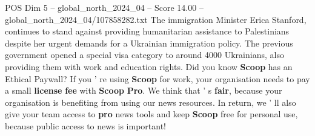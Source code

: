 \begin{textsample}{POS Dim 5 – global\_north\_2024\_04 – Score 14.00 – global\_north\_2024\_04/107858282.txt}
The immigration Minister Erica Stanford, continues to stand against providing humanitarian assistance to Palestinians despite her urgent demands for a Ukrainian immigration policy.
The previous government opened a special visa category to around 4000 Ukrainians, also providing them with work and education rights.
Did you know \textbf{Scoop} has an Ethical Paywall?
If you ' re using \textbf{Scoop} for work, your organisation needs to pay a small \textbf{license} \textbf{fee} with \textbf{Scoop} \textbf{Pro}.
We think that ' s \textbf{fair}, because your organisation is benefiting from using our news resources.
In return, we ' ll also give your team access to \textbf{pro} news tools and keep \textbf{Scoop} free for personal use, because public access to news is important!

\end{textsample}
